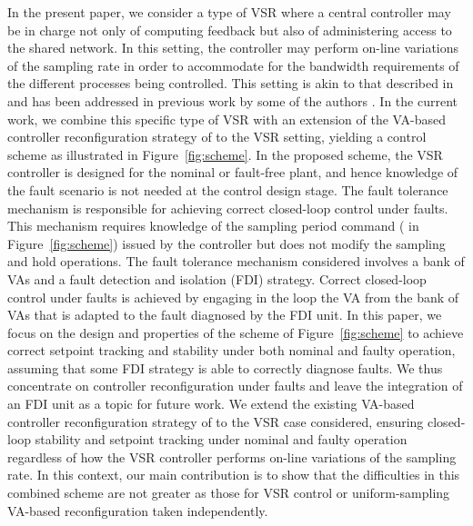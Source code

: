 \documentclass[letterpaper, 10 pt, conference]{ieeeconf}
\begin{document}
In the present paper, we consider a type of VSR where a central
controller may be in charge not only of computing feedback but also of
administering access to the shared network. In this setting, the
controller may perform on-line variations of the sampling rate in
order to accommodate for the bandwidth requirements of the different
processes being controlled. This setting is akin to that described in
\cite{cereke_rts02} and has been addressed in previous work by some of
the authors \cite{haimoose_nahs12, haimo_ifac2011,osehaimo_rpic2011,
  osehaimo_aadeca2012}. In the current work, we combine this specific type of VSR with an extension of the VA-based controller reconfiguration strategy of \cite{seron_bankVA_ifac11} to the VSR setting, yielding a control scheme as illustrated in Figure~\ref{fig:scheme}. In the proposed scheme, the VSR controller is designed for the nominal or fault-free plant, and hence knowledge of the fault scenario is not needed at the control design stage. The fault tolerance mechanism is responsible for achieving correct closed-loop control under faults. This mechanism requires knowledge of the sampling period command ( in Figure~\ref{fig:scheme}) issued by the controller but does not modify the sampling and hold operations. The fault tolerance mechanism considered involves a bank of VAs and a fault detection and isolation (FDI) strategy. Correct closed-loop control under faults is achieved by engaging in the loop the VA from the bank of VAs that is adapted to
the fault diagnosed by the FDI unit. In this paper, we focus on the design and properties of the scheme of Figure~\ref{fig:scheme} to achieve correct setpoint tracking and stability under both nominal and faulty operation, assuming that some FDI strategy is able to correctly diagnose faults. We thus concentrate on controller reconfiguration under faults and leave the integration of an FDI unit as a topic for future work. 
We extend the existing VA-based controller reconfiguration strategy of \cite{seron_bankVA_ifac11} to the VSR case considered, ensuring closed-loop stability and setpoint tracking under nominal and faulty operation regardless of how the VSR controller performs on-line variations of the sampling rate. In this context, our main contribution is to show that the difficulties in this combined scheme are not greater as those for VSR control or uniform-sampling VA-based reconfiguration taken independently.
\end{document}
